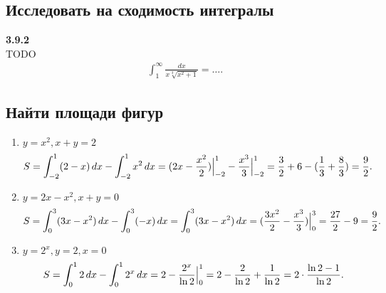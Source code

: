 \subsection{Исследовать на сходимость интегралы}
\textbf{3.9.2} \\
TODO
\begin{align*}
  \int_{1}^{\infty} \frac{dx}{x \sqrt[3]{x^2+1}} = \ldots 
.\end{align*}
\subsection{Найти площади фигур}
\begin{enumerate}
  \item $y = x^2, x + y = 2$
    \begin{align*}
      S = \int_{-2}^{1} (2-x)\,dx - \int_{-2}^{1} x^2\,dx = (2x-\frac{x^2}{2})\Big|^1_{-2} - \frac{x^3}{3}\Big|^1_{-2} =
      \frac{3}{2} + 6 - (\frac{1}{3} + \frac{8}{3}) = \frac{9}{2}
    .\end{align*}
  \item $y = 2x - x^2, x + y = 0$
    \begin{align*}
      S = \int_{0}^{3}(3x-x^2) \,dx - \int_{0}^{3} (-x)\,dx = \int_{0}^{3} (3x-x^2) \,dx = 
      (\frac{3x^2}{2} - \frac{x^3}{3})\Big|^3_0 = \frac{27}{2} - 9 = \frac{9}{2}
    .\end{align*}
  \item $y=2^x, y = 2, x = 0$
    \begin{align*}
      S = \int_{0}^{1} 2\,dx - \int_{0}^{1} 2^x\,dx = 2 - \frac{2^x}{\ln 2}\Big|^1_0 = 2 - \frac{2}{\ln 2} + \frac{1}{\ln 2} = 2\cdot \frac{\ln 2-1}{\ln 2}  
    .\end{align*}
\end{enumerate}
